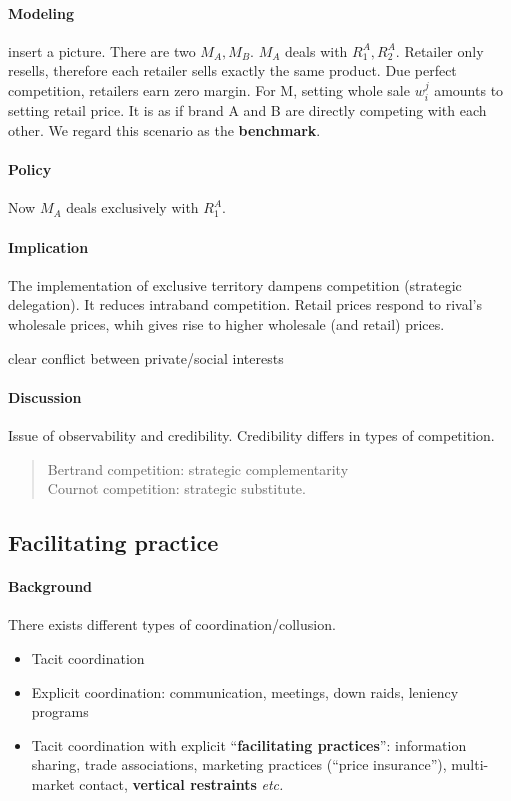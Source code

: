 \paragraph{Modeling}
insert a picture.
There are two $M_A, M_B$. $M_A$ deals with $R_1^A, R_2^A$. Retailer only resells, therefore each retailer sells exactly the same product. Due perfect competition, retailers earn zero margin. For M, setting whole sale $w_i^j$ amounts to setting retail price. It is as if brand A and B are directly competing with each other.
We regard this scenario as the \textbf{benchmark}.
\paragraph{Policy} Now $M_A$ deals exclusively with $R_1^A$.
\paragraph{Implication} The implementation of exclusive territory dampens competition (strategic delegation). It reduces intraband competition. Retail prices respond to rival’s wholesale prices, whih gives rise to higher wholesale (and retail) prices.
\begin{remark}
    clear conflict between private/social interests
\end{remark}
\paragraph{Discussion}
Issue of observability and credibility. 
Credibility differs in types of competition.
\begin{quote}
    Bertrand competition: strategic complementarity\\
    Cournot competition: strategic substitute.
\end{quote}
    
\subsection{Facilitating practice}
\paragraph{Background} There exists different types of coordination/collusion. 
\begin{itemize}
    \item Tacit coordination
    \item Explicit coordination: communication, meetings, down raids, leniency programs
    \item Tacit coordination with explicit ``\textbf{facilitating practices}'': information sharing, trade associations, marketing practices (``price insurance''), multi-market contact, \textbf{vertical restraints} \emph{etc.} 
\end{itemize}
